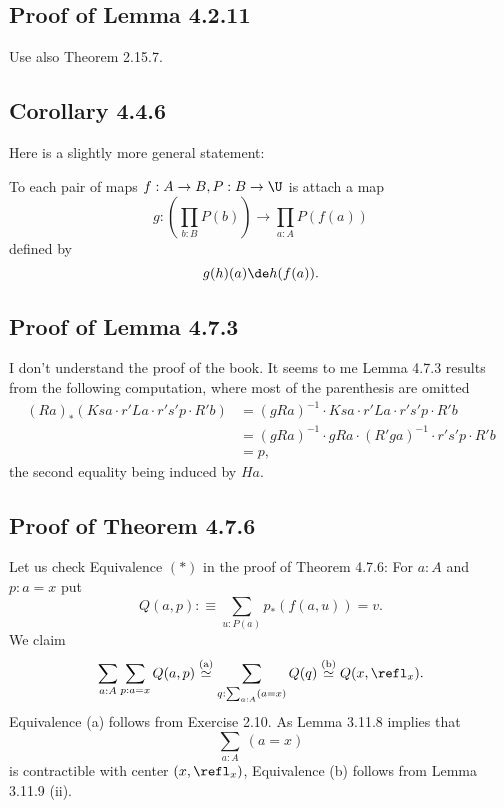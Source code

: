 \documentclass[12pt]{article}
\begin{document}

\subsection{Proof of Lemma 4.2.11}

Use also Theorem 2.15.7.


\subsection{Corollary 4.4.6}

Here is a slightly more general statement:

To each pair of maps $f:A\to B,P:B\to\U$ is attach a map 
$$
g:\left(\prod_{b:B}P(b)\right)\to\prod_{a:A}P(f(a))
$$ 
defined by 
$$
g(h)(a)\de h(f(a)).
$$



\subsection{Proof of Lemma 4.7.3}

I don't understand the proof of the book. It seems to me Lemma 4.7.3 results from the following computation, where most of the parenthesis are omitted
\begin{align*}
(Ra)_*(Ksa\cdot r'La\cdot r's'p\cdot R'b)
&=(gRa)^{-1}\cdot Ksa\cdot r'La\cdot r's'p\cdot R'b\\ 
&=(gRa)^{-1}\cdot gRa\cdot (R'ga)^{-1}\cdot r's'p\cdot R'b\\ 
&=p,
\end{align*} 
the second equality being induced by $Ha$.


\subsection{Proof of Theorem 4.7.6}

Let us check Equivalence $(*)$ in the proof of Theorem 4.7.6: For $a:A$ and $p:a=x$ put 
$$
Q(a,p):\equiv\sum_{u:P(a)}p_*(f(a,u))=v.
$$ 
We claim 
$$
\sum_{a:A}\sum_{p:a=x}Q(a,p)\overset{(\text a)}{\simeq}
\sum_{q:\sum_{a:A}(a=x)}Q(q)\overset{(\text b)}{\simeq}
Q(x,\refl_x).
$$
Equivalence (a) follows from Exercise 2.10. As Lemma 3.11.8 implies that $$\sum_{a:A}\ (a=x)$$ is contractible with center $(x,\refl_x)$, Equivalence (b) follows from Lemma 3.11.9 (ii). 
\end{document}

